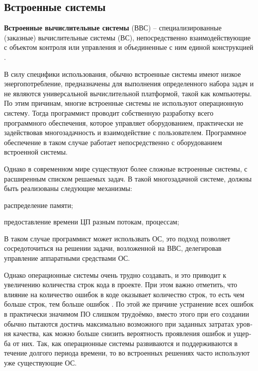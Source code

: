 \subsection{Встроенные системы}
\label{subsec:linux-for-embedded-systems}

\textbf{Встроенные вычислительные системы} (ВВС) – специализированные (заказные) вычислительные системы (ВС), непосредственно взаимодействующие с объектом контроля или управления и объединенные с ним единой конструкцией \cite{EMBEDDED}.

В силу специфики использования, обычно встроенные системы имеют низкое энергопотребление, предназначены для выполнения определенного набора задач и не являются универсальной вычислительной платформой, такой как компьютеры. По этим причинам, многие встроенные системы не используют операционную систему. Тогда программист проводит собственную разработку всего программного обеспечения, которое управляет оборудованием, практически не задействовав многозадачность и взаимодействие с пользователем. Программное обеспечение в таком случае работает непосредственно с оборудованием встроенной системы.

Однако в современном мире существуют более сложные встроенные системы, с расширенным списком решаемых задач. 
В такой многозадачной системе, должны быть реализованы следующие механизмы:
\begin{dashitemize}
  \item распределение памяти;
  \item предоставление времени ЦП разным потокам, процессам;
\end{dashitemize}

В таком случае программист может использвать ОС, это подход позволяет сосредоточиться на решении задачи, возложенной на ВВС, делегировав управление аппаратными средствами ОС.

Однако операционные системы очень трудно создавать, и это приводит к увеличению количества строк кода в проекте. 
При этом важно отметить, что влияние на количество ошибок в коде оказывает количество строк, то есть чем больше строк, тем больше ошибок \cite{EMBEDDED}. 
По этой же причине уст­ра­не­ние всех оши­бок в прак­ти­че­ски зна­чи­мом ПО слиш­ком тру­до­ём­ко, вме­сто это­го при его соз­да­нии обыч­но пы­та­ют­ся дос­тичь мак­си­маль­но воз­мож­но­го при за­дан­ных за­тра­тах уров­ня ка­че­ст­ва, как мож­но боль­ше сни­зить ве­ро­ят­ность про­яв­ле­ния оши­бок и ущер­ба от них. 
Так, как операционные системы развиваются и поддерживаются в течение долгого периода времени\cite{TANENBAUM}, то во встроенных решениях часто используют уже существующие ОС.

